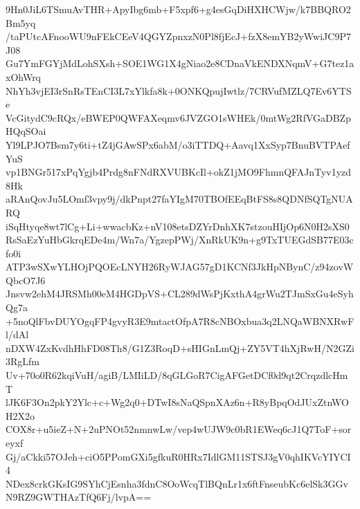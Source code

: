 9Hn0JiL6TSmuAvTHR+ApyIbg6mb+F5xpf6+g4esGqDiHXHCWjw/k7BBQRO2Bm5yq
/taPUtcAFnooWU9nFEkCEeV4QGYZpnxzN0Pl8fjEcJ+fzX8emYB2yWwiJC9P7J08
Gu7YmFGYjMdLohSXsh+SOE1WG1X4gNiao2e8CDnaVkENDXNqmV+G7tez1axOhWrq
NhYh3vjEI3rSnRsTEnCI3L7xYlkfa8k+0ONKQpujIwtlz/7CRVufMZLQ7Ev6YTSe
VcGitydC9cRQx/eBWEP0QWFAXeqmv6JVZGO1sWHEk/0mtWg2RfVGaDBZpHQqSOai
Yl9LPJO7Bsm7y6ti+tZ4jGAwSPx6abM/o3iTTDQ+Aavq1XxSyp7BnuBVTPAefYuS
vp1BNGr517xPqYgjb4Prdg8nFNdRXVUBKcIl+okZ1jMO9FhmnQFAJnTyv1yzd8Hk
aRAnQovJu5LOmf3vpy9j/dkPnpt27faYIgM70TBOfEEqBtFS8s8QDNfSQTgNUARQ
iSqHtyqe8wt7lCg+Li+wwacbKz+nV108etsDZYrDnhXK7stzouHIjOp6N0H2sXS0
RsSaEzYuHbGkrqEDe4m/Wn7a/YgzepPWj/XnRkUK9n+g9TxTUEGdSB77E03cfo0i
ATP3wSXwYLHOjPQOEcLNYH26RyWJAG57gD1KCNf3JkHpNBynC/z94zovWQbcO7J6
Jnsvw2ehM4JRSMh00eM4HGDpVS+CL289dWsPjKxthA4grWu2TJmSxGu4eSyhQg7a
+5noQlFbvDUYOgqFP4gvyR3E9mtactOfpA7R8cNBOxbua3q2LNQaWBNXRwFl/dAl
nDXW4ZxKvdhHhFD08Th8/G1Z3RoqD+sHIGnLmQj+ZY5VT4hXjRwH/N2GZi3RgLfm
Uv+70o0R62kqiVuH/agiB/LMIiLD/8qGLGoR7CigAFGetDCf0d9qt2CrqzdlcHmT
lJK6F3On2pkY2Ylc+c+Wg2q0+DTwI8sNaQSpnXAz6n+R8yBpqOdJUxZtnWOH2X2o
COX8r+u5ieZ+N+2uPNOt52nmnwLw/vep4wUJW9c0bR1EWeq6cJ1Q7ToF+soreyxf
Gj/aCkki57OJeh+ciO5PPomGXi5gfkuR0HRx7IdlGM11STSJ3gV0qhIKVcYIYCI4
NDex8crkGKsIG9SYhCjEsnha3fdnC8OoWcqTlBQnLr1x6ftFnseubKc6elSk3GGv
N9RZ9GWTHAzTfQ6Fj/lvpA==
